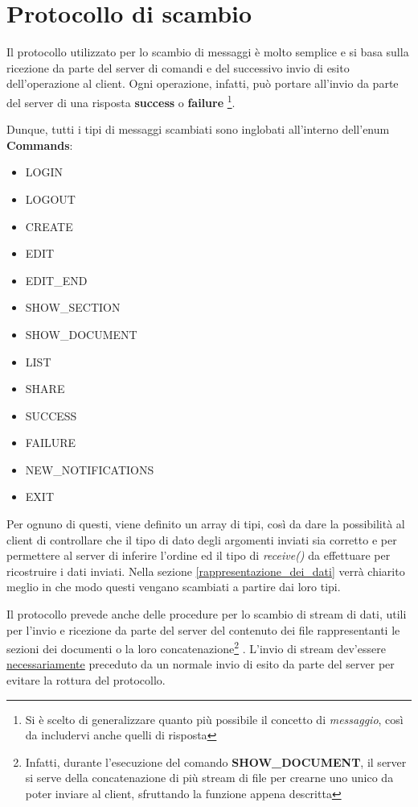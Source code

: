 \section{Protocollo di scambio}
Il protocollo utilizzato per lo scambio di messaggi è molto semplice e si basa sulla ricezione da parte del server di comandi e del successivo invio di esito dell'operazione al client. Ogni operazione, infatti, può portare all'invio da parte del server di una risposta \textbf{success} o \textbf{failure} \footnote{Si è scelto di generalizzare quanto più possibile il concetto di \textit{messaggio}, così da includervi anche quelli di risposta}.

Dunque, tutti i tipi di messaggi scambiati sono inglobati all'interno dell'enum \textbf{Commands}:
\begin{multicols}{2}
	\begin{itemize}
		\item LOGIN
		\item LOGOUT
		\item CREATE
		\item EDIT
		\item EDIT\_END
		\item SHOW\_SECTION
		\item SHOW\_DOCUMENT
	\end{itemize}
	\begin{itemize}
		\item LIST
		\item SHARE
		\item SUCCESS
		\item FAILURE
		\item NEW\_NOTIFICATIONS
		\item EXIT
	\end{itemize}
\end{multicols}
Per ognuno di questi, viene definito un array di tipi, così da dare la possibilità al client di controllare che il tipo di dato degli argomenti inviati sia corretto e per permettere al server di inferire l'ordine ed il tipo di \textit{receive()} da effettuare per ricostruire i dati inviati. Nella sezione \ref{rappresentazione_dei_dati} verrà chiarito meglio in che modo questi vengano scambiati a partire dai loro tipi.

Il protocollo prevede anche delle procedure per lo scambio di stream di dati, utili per l'invio e ricezione da parte del server del contenuto dei file rappresentanti le sezioni dei documenti o la loro concatenazione\footnote{Infatti, durante l'esecuzione del comando \textbf{SHOW\_DOCUMENT}, il server si serve della concatenazione di più stream di file per crearne uno unico da poter inviare al client, sfruttando la funzione appena descritta} .
L'invio di stream dev'essere \underline{necessariamente} preceduto da un normale invio di esito da parte del server per evitare la rottura del protocollo.

